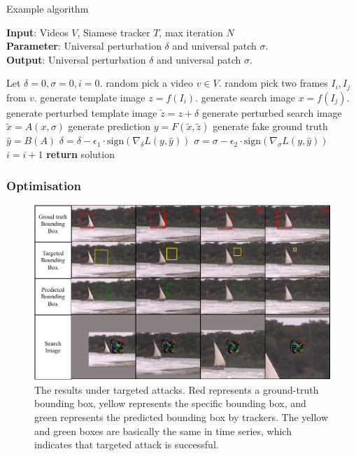 \documentclass{article}
\begin{document}
\begin{algorithm}[tb]
\caption{Example algorithm}
\label{alg:algorithm}
\textbf{Input}: Videos $V$, Siamese tracker $T$, max iteration $N$\\
\textbf{Parameter}: Universal perturbation $\delta$ and universal patch $\sigma$.\\
\textbf{Output}: Universal perturbation $\delta$ and universal patch $\sigma$.
\begin{algorithmic}[1] %
\STATE Let $\delta=0, \sigma=0, i = 0$.
\STATE random pick a video $v\in V$.
\STATE random pick two frames $I_i, I_j$ from $v$.
\STATE generate template image $z = f(I_i)$.
\STATE generate search image $x = f(I_j)$.
\STATE generate perturbed template image $\tilde z = z + \delta$
\STATE generate perturbed search image $\tilde x = A(x, \sigma)$
\STATE generate prediction $y = F(\tilde x, \tilde z)$
\STATE generate fake ground truth $\hat y = B(A)$
\STATE $\delta = \delta - \epsilon_1\cdot\text{sign}(\nabla_{\delta}L(y, \hat y))$
\STATE $\sigma = \sigma - \epsilon_2 \cdot \text{sign}(\nabla_{\sigma}L(y, \hat y))$
\STATE $i = i + 1$
\ENDWHILE
\STATE \textbf{return} solution
\end{algorithmic}
\end{algorithm}

\subsubsection{Optimisation}

\begin{figure}[t]
\centering
\includegraphics{images/vis_v2.pdf}
\caption{The results under targeted attacks. Red represents a ground-truth bounding box, yellow represents the specific bounding box, and green represents the predicted bounding box by trackers. The yellow and green boxes are basically the same in time series, which indicates that targeted attack is successful.}
\label{fig:vis}
\end{figure}
\end{document}
